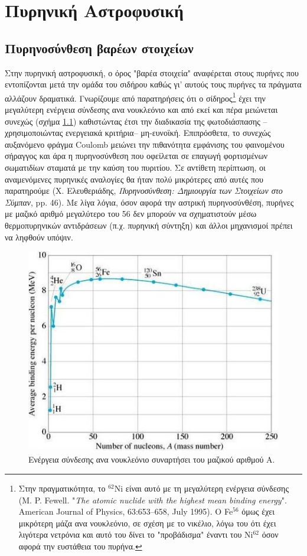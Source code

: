 \chapter{Πυρηνική Αστροφυσική}
\label{apx:nucleosynthesis}

\section{Πυρηνοσύνθεση βαρέων στοιχείων}
Στην πυρηνική αστροφυσική, ο όρος "βαρέα στοιχεία" αναφέρεται στους πυρήνες που εντοπίζονται μετά την ομάδα του σιδήρου καθώς γι' αυτούς τους πυρήνες τα πράγματα αλλάζουν δραματικά. Γνωρίζουμε από παρατηρήσεις ότι ο σίδηρος\footnote{Στην πραγματικότητα, το $^{62}$Ni είναι αυτό με τη μεγαλύτερη ενέργεια σύνδεσης (M. P. Fewell. "\textit{The atomic nuclide with the highest mean binding energy}". American Journal of Physics, 63:653–658, July 1995). Ο Fe$^{56}$ όμως έχει μικρότερη μάζα ανα νουκλεόνιο, σε σχέση με το νικέλιο, λόγω του ότι έχει λιγότερα νετρόνια και αυτό του δίνει το "προβάδισμα" έναντι του Ni$^{62}$ όσον αφορά την ευστάθεια του πυρήνα.} έχει την μεγαλύτερη ενέργεια σύνδεσης ανα νουκλεόνιο και από εκεί και πέρα μειώνεται συνεχώς (σχήμα \ref{fig:apx:binding_energy_per_nucleon}) καθιστώντας έτσι την διαδικασία της φωτοδιάσπασης --χρησιμοποιώντας ενεργειακά κριτήρια-- μη-ευνοϊκή. Επιπρόσθετα, το συνεχώς αυξανόμενο φράγμα Coulomb μειώνει την πιθανότητα εμφάνισης του φαινομένου σήραγγος και άρα η πυρηνοσύνθεση που οφείλεται σε επαγωγή φορτισμένων σωματιδίων σταματά με την καύση του πυριτίου. Σε αντίθετη περίπτωση, οι αναμενόμενες πυρηνικές αναλογίες θα ήταν πολύ μικρότερες από αυτές που παρατηρούμε (Χ. Ελευθεριάδης, \textit{Πυρηνοσύνθεση: Δημιουργία των Στοιχείων στο Σύμπαν}, pp. 46). Με λίγα λόγια, όσον αφορά την αστρική πυρηνοσύνθέση, πυρήνες με μαζικό αριθμό μεγαλύτερο του 56 δεν μπορούν να σχηματιστούν μέσω θερμοπυρηνικών αντιδράσεων (π.χ. πυρηνική σύντηξη) και άλλοι μηχανισμοί πρέπει να ληφθούν υπόψιν.

\begin{figure}
  \centering
    \includegraphics[scale=0.7]{Figures/benergy.jpg}
    \caption{Ενέργεια σύνδεσης ανα νουκλεόνιο συναρτήσει του μαζικού αριθμού Α.}
    \label{fig:apx:binding_energy_per_nucleon}
\end{figure}

